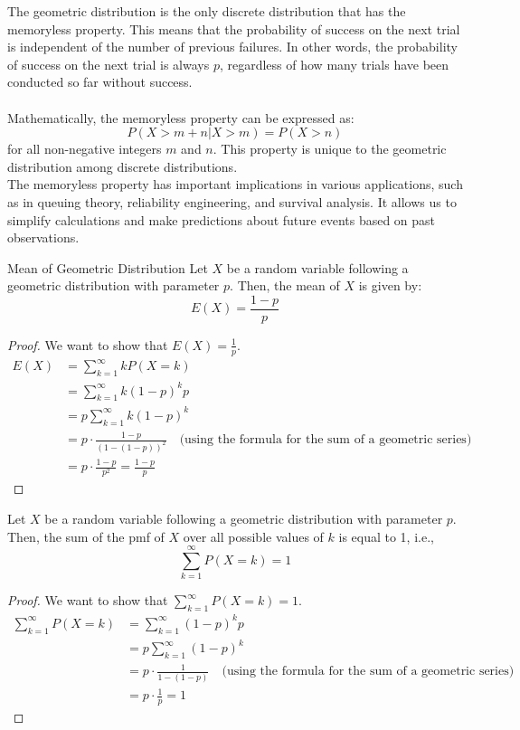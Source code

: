 \documentclass[openany]{book}
\begin{document}
\begin{mynote}
    The geometric distribution is the only discrete distribution that has the memoryless property. This means that the probability of success on the next trial is independent of the number of previous failures. In other words, the probability of success on the next trial is always $p$, regardless of how many trials have been conducted so far without success. \\\\
    Mathematically, the memoryless property can be expressed as:
    $$P(X > m + n | X > m) = P(X > n)$$
    for all non-negative integers $m$ and $n$. This property is unique to the geometric distribution among discrete distributions. \\ 
    The memoryless property has important implications in various applications, such as in queuing theory, reliability engineering, and survival analysis. It allows us to simplify calculations and make predictions about future events based on past observations.
\end{mynote}
\begin{mytheorem}{Mean of Geometric Distribution}
    Let $X$ be a random variable following a geometric distribution with parameter $p$. Then, the mean of $X$ is given by:
    $$E(X) = \frac{1-p}{p}$$
\end{mytheorem}
\begin{proof}
    We want to show that $E(X) = \frac{1}{p}$.
    \begin{align*}
        E(X) &= \sum_{k=1}^{\infty} k P(X = k) \\
        &= \sum_{k=1}^{\infty} k (1 - p)^{k} p \\
        &= p \sum_{k=1}^{\infty} k (1 - p)^{k} \\
        &= p \cdot \frac{1 - p}{(1 - (1 - p))^2} \quad \text{(using the formula for the sum of a geometric series)} \\
        &= p \cdot \frac{1 - p}{p^2} = \frac{1 - p}{p}
    \end{align*}
\end{proof}
\begin{mytheorem}
    Let $X$ be a random variable following a geometric distribution with parameter $p$. Then, the sum of the pmf of $X$ over all possible values of $k$ is equal to 1, i.e.,
    $$\sum_{k=1}^{\infty} P(X = k) = 1$$
\end{mytheorem}
\begin{proof}
    We want to show that $\sum_{k=1}^{\infty} P(X = k) = 1$.
    \begin{align*}
        \sum_{k=1}^{\infty} P(X = k) &= \sum_{k=1}^{\infty} (1 - p)^{k} p \\
        &= p \sum_{k=1}^{\infty} (1 - p)^{k} \\
        &= p \cdot \frac{1}{1 - (1 - p)} \quad \text{(using the formula for the sum of a geometric series)} \\
        &= p \cdot \frac{1}{p} = 1
    \end{align*}
\end{proof}
\end{document}
